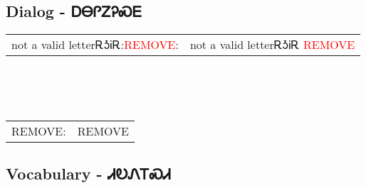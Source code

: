 \newpage\subsection{Dialog - ᎠᎾᎵᏃᎮᏍᎬ}
\begin{tabular}{p{2cm} p{11cm}}
not a valid letterᎡᎼᎥᎡ:\newline \textcolor{red}{REMOVE}: & not a valid letterᎡᎼᎥᎡ 
\newline\textcolor{red}{REMOVE}\\
\end{tabular}
\\
\\
\\
\noindent\begin{tabular}{p{2cm} p{11cm}}REMOVE: & REMOVE\\
\end{tabular}
\vfill\newpage\subsection{Vocabulary - ᏗᎧᏁᎢᏍᏗ 
}
